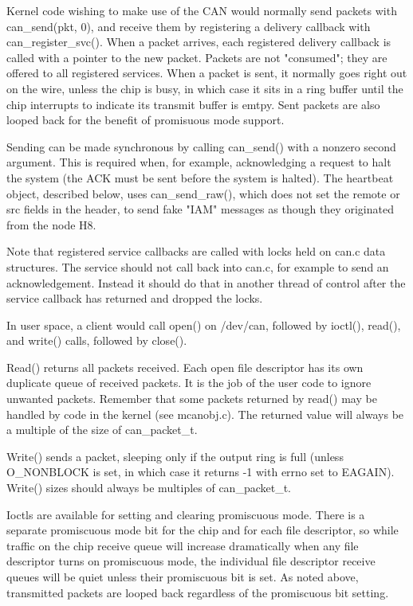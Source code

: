 \documentclass{article}
\begin{document}
  Kernel code wishing to make use of the CAN would normally send packets 
with can\_send(pkt, 0), and receive them by registering a delivery callback 
with can\_register\_svc().  When a packet arrives, each registered delivery
callback is called with a pointer to the new packet.  Packets are not
"consumed"; they are offered to all registered services.  When a packet
is sent, it normally goes right out on the wire, unless the chip is busy,
in which case it sits in a ring buffer until the chip interrupts to indicate
its transmit buffer is emtpy.  Sent packets are also looped back for the
benefit of promisuous mode support.

  Sending can be made synchronous by calling can\_send() with a nonzero second 
argument.  This is required when, for example, acknowledging a request to 
halt the system (the ACK must be sent before the system is halted).  The 
heartbeat object, described below, uses can\_send\_raw(), which does not set 
the remote or src fields in the header, to send fake "IAM" messages as 
though they originated from the node H8.  

  Note that registered service callbacks are called with locks held on can.c
data structures.  The service should not call back into can.c, for example
to send an acknowledgement.  Instead it should do that in another thread of
control after the service callback has returned and dropped the locks.

  In user space, a client would call open() on /dev/can, followed by ioctl(),
read(), and write() calls, followed by close().  

  Read() returns all packets received.  Each open file descriptor has its own
duplicate queue of received packets.  It is the job of the user code to ignore
unwanted packets.  Remember that some packets returned by read() may be 
handled by code in the kernel (see mcanobj.c).  The returned value will 
always be a multiple of the size of can\_packet\_t.

  Write() sends a packet, sleeping only if the output ring is full (unless
O\_NONBLOCK is set, in which case it returns -1 with errno set to EAGAIN).
Write() sizes should always be multiples of can\_packet\_t.

  Ioctls are available for setting and clearing promiscuous mode.  There is
a separate promiscuous mode bit for the chip and for each file descriptor,
so while traffic on the chip receive queue will increase dramatically when 
any file descriptor turns on promiscuous mode, the individual file descriptor
receive queues will be quiet unless their promiscuous bit is set.  As noted
above, transmitted packets are looped back regardless of the promiscuous
bit setting.
\end{document}
